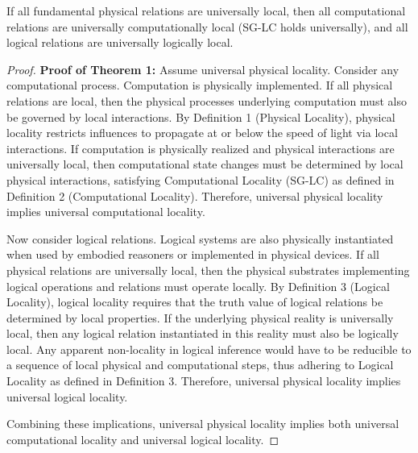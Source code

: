 	\begin{theorem}
		If all fundamental physical relations are universally local, then all computational relations are universally computationally local (SG-LC holds universally), and all logical relations are universally logically local.
	\end{theorem}
	\begin{proof}
		\textbf{Proof of Theorem 1:} Assume universal physical locality. Consider any computational process. Computation is physically implemented. If all physical relations are local, then the physical processes underlying computation must also be governed by local interactions. By Definition 1 (Physical Locality), physical locality restricts influences to propagate at or below the speed of light via local interactions. If computation is physically realized and physical interactions are universally local, then computational state changes must be determined by local physical interactions, satisfying Computational Locality (SG-LC) as defined in Definition 2 (Computational Locality). Therefore, universal physical locality implies universal computational locality.
		
		Now consider logical relations. Logical systems are also physically instantiated when used by embodied reasoners or implemented in physical devices. If all physical relations are universally local, then the physical substrates implementing logical operations and relations must operate locally. By Definition 3 (Logical Locality), logical locality requires that the truth value of logical relations be determined by local properties. If the underlying physical reality is universally local, then any logical relation instantiated in this reality must also be logically local. Any apparent non-locality in logical inference would have to be reducible to a sequence of local physical and computational steps, thus adhering to Logical Locality as defined in Definition 3. Therefore, universal physical locality implies universal logical locality.
		
		Combining these implications, universal physical locality implies both universal computational locality and universal logical locality.
	\end{proof}
	
